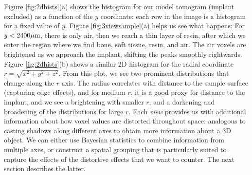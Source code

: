 Figure \ref{fig:2dhists}(a)
shows the histogram for our model tomogram (implant excluded) as a function of the $y$ coordinate: each row in the image is a histogram for a fixed value of $y$.
Figure \ref{fig:3viewsample}(a) helps us see what happens: For $y<2400\mu\text{m}$, there is only air, then we reach a thin layer of resin, after which we enter
the region where we find bone, soft tissue, resin, and air. The air voxels are brightened as we approach the implant, shifting the peaks smoothly rightwards.
Figure \ref{fig:2dhists}(b) shows a similar 2D histogram for the radial coordinate $r=\sqrt{x^2+y^2+z^2}$.
From this plot, we see two prominent distributions that change along the $r$ axis. The radius correlates with distance to the sample surface
(capturing edge effects), and for medium $r$, it is a good proxy for distance to the implant, and we see a brightening with smaller $r$, and a darkening and
broadening of the distributions for large $r$. Each {\em view} provides us with additional information about how voxel values are distorted throughout space:
analogous to casting shadows along different axes to obtain more information about a 3D object. We can either use Bayesian statistics to combine information
from multiple axes, or construct a spatial grouping that is particularly suited to capture the effects of the distortive effects that we want to counter.
The next section describes the latter.


